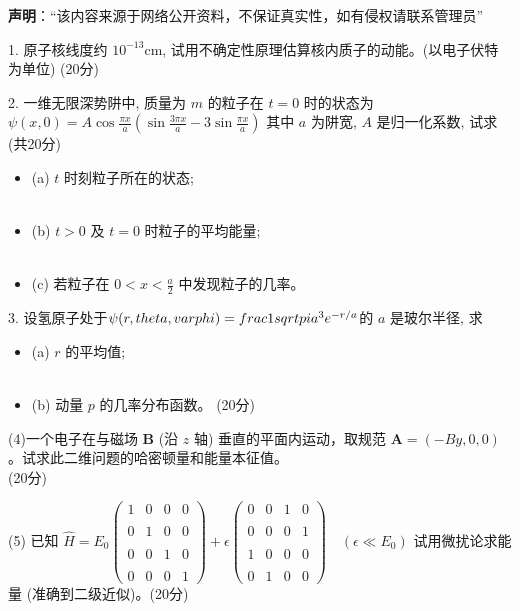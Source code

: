 
\textbf{声明}：“该内容来源于网络公开资料，不保证真实性，如有侵权请联系管理员”

1. 原子核线度约 $10^{-13} \text{cm}$, 试用不确定性原理估算核内质子的动能。(以电子伏特为单位)  (20分)

2. 一维无限深势阱中, 质量为 $m$ 的粒子在 $t=0$ 时的状态为 
$\psi(x,0) = A \cos \frac{\pi x}{a} \left( \sin \frac{3 \pi x}{a} - 3 \sin \frac{\pi x}{a} \right)$
其中 $a$ 为阱宽, $A$ 是归一化系数, 试求 (共20分) 
\begin{itemize}
\item  (a) $t$ 时刻粒子所在的状态; \\\\
\item  (b) $t>0$ 及 $t=0$ 时粒子的平均能量; \\\\
\item  (c) 若粒子在 $0 < x < \frac{a}{2}$ 中发现粒子的几率。\\
\end{itemize}
3. 设氢原子处于$\psi(r, \\theta, \\varphi) = \\frac{1}{\\sqrt{\\pi a^3}} e^{-r/a}$的 $a$ 是玻尔半径, 求 
\begin{itemize}
\item (a) $r$ 的平均值; \\\\
\item  (b) 动量 $p$ 的几率分布函数。  (20分)
\end{itemize}
(4)一个电子在与磁场 $\mathbf{B}$ (沿 $z$ 轴) 垂直的平面内运动，取规范 $\mathbf{A} = (-By, 0, 0)$。试求此二维问题的哈密顿量和能量本征值。\\  (20分)

(5) 已知
$\hat{H} = E_0 \begin{pmatrix}1 & 0 & 0 & 0 \\\\0 & 1 & 0 & 0 \\\\0 & 0 & 1 & 0 \\\\0 & 0 & 0 & 1 \end{pmatrix}+ \epsilon \begin{pmatrix}0 & 0 & 1 & 0 \\\\0 & 0 & 0 & 1 \\\\1 & 0 & 0 & 0 \\\\0 & 1 & 0 & 0 \end{pmatrix}\quad \left( \epsilon \ll E_0 \right)$
试用微扰论求能量 (准确到二级近似)。(20分)
